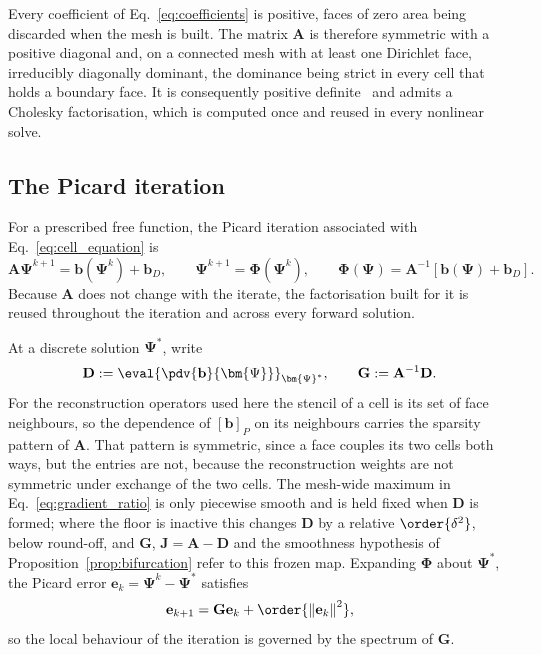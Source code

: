 Every coefficient of Eq.~\eqref{eq:coefficients} is positive, faces of zero area being discarded when the mesh is built. The matrix $\mathbf{A}$ is therefore symmetric with a positive diagonal and, on a connected mesh with at least one Dirichlet face, irreducibly diagonally dominant, the dominance being strict in every cell that holds a boundary face. It is consequently positive definite~\cite{Varga2000MatrixAnalysis,Eymard2000FiniteMethods} and admits a Cholesky factorisation, which is computed once and reused in every nonlinear solve.

\subsection{The Picard iteration}
\label{subsec:picard_iteration}

For a prescribed free function, the Picard iteration associated with Eq.~\eqref{eq:cell_equation} is
\begin{equation}
  \mathbf{A}\bm{\Psi}^{k+1}
  =
  \mathbf{b}(\bm{\Psi}^{k})
  +
  \mathbf{b}_D ,
  \qquad
  \bm{\Psi}^{k+1} = \bm{\Phi}(\bm{\Psi}^{k}),
  \qquad
  \bm{\Phi}(\bm{\Psi})
  =
  \mathbf{A}^{-1}
  \left[
    \mathbf{b}(\bm{\Psi}) + \mathbf{b}_D
  \right] .
  \label{eq:picard_iteration}
\end{equation}
Because $\mathbf{A}$ does not change with the iterate, the factorisation built for it is reused throughout the iteration and across every forward solution.

At a discrete solution $\bm{\Psi}^{*}$, write
\begin{equation}
  \mathbf{D}
  :=
  \eval{\pdv{\mathbf{b}}{\bm{\Psi}}}_{\bm{\Psi}^{*}} ,
  \qquad
  \mathbf{G}
  :=
  \mathbf{A}^{-1}\mathbf{D} .
  \label{eq:picard_operator}
\end{equation}
For the reconstruction operators used here the stencil of a cell is its set of face neighbours, so the dependence of $\left[\mathbf{b}\right]_P$ on its neighbours carries the sparsity pattern of $\mathbf{A}$. That pattern is symmetric, since a face couples its two cells both ways, but the entries are not, because the reconstruction weights are not symmetric under exchange of the two cells. The mesh-wide maximum in Eq.~\eqref{eq:gradient_ratio} is only piecewise smooth and is held fixed when $\mathbf{D}$ is formed; where the floor is inactive this changes $\mathbf{D}$ by a relative $\order{\delta^{2}}$, below round-off, and $\mathbf{G}$, $\mathbf{J}=\mathbf{A}-\mathbf{D}$ and the smoothness hypothesis of Proposition~\ref{prop:bifurcation} refer to this frozen map. Expanding $\bm{\Phi}$ about $\bm{\Psi}^{*}$, the Picard error $\mathbf{e}_k=\bm{\Psi}^{k}-\bm{\Psi}^{*}$ satisfies
\begin{equation}
\mathbf{e}_{k+1}
  =
  \mathbf{G}\mathbf{e}_{k}
  +
  \order{\left\| \mathbf{e}_{k} \right\|^{2}} ,
  \label{eq:picard_error}
\end{equation}
so the local behaviour of the iteration is governed by the spectrum of $\mathbf{G}$.

